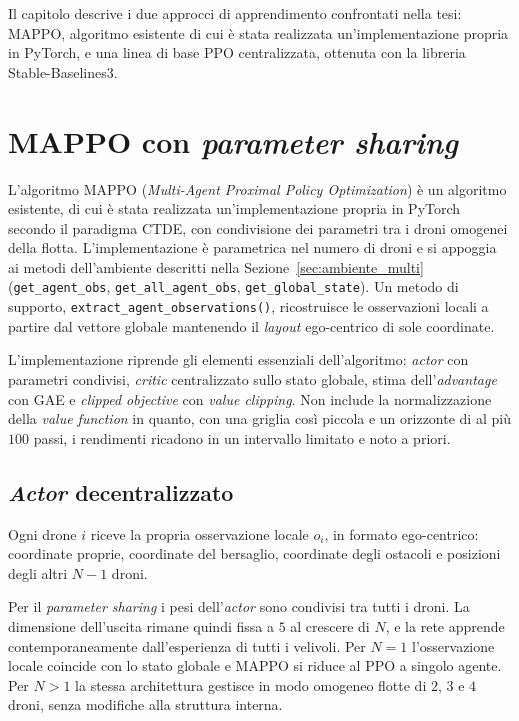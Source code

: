 \documentclass[12pt,a4paper,twoside]{report}
\newcommand{\parencite}[1]{\citep{#1}}
\begin{document}
Il capitolo descrive i due approcci di apprendimento confrontati nella tesi: MAPPO, algoritmo esistente di cui è stata realizzata un'implementazione propria in PyTorch, e una linea di base PPO centralizzata, ottenuta con la libreria Stable-Baselines3.

\section{MAPPO con \emph{parameter sharing}}
\label{sec:mappo}

L'algoritmo MAPPO (\emph{Multi-Agent Proximal Policy Optimization}) \parencite{yu2022} è un algoritmo esistente, di cui è stata realizzata un'implementazione propria in PyTorch secondo il paradigma CTDE, con condivisione dei parametri tra i droni omogenei della flotta. L'implementazione è parametrica nel numero di droni e si appoggia ai metodi dell'ambiente descritti nella Sezione~\ref{sec:ambiente_multi} (\texttt{get\_agent\_obs}, \texttt{get\_all\_agent\_obs}, \texttt{get\_global\_state}). Un metodo di supporto, \texttt{extract\_\allowbreak agent\_\allowbreak observations()}, ricostruisce le osservazioni locali a partire dal vettore globale mantenendo il \emph{layout} ego-centrico di sole coordinate.

L'implementazione riprende gli elementi essenziali dell'algoritmo: \emph{actor} con parametri condivisi, \emph{critic} centralizzato sullo stato globale, stima dell'\emph{advantage} con GAE e \emph{clipped objective} con \emph{value clipping}. Non include la normalizzazione della \emph{value function} in quanto, con una griglia così piccola e un orizzonte di al più $100$ passi, i rendimenti ricadono in un intervallo limitato e noto a priori.

\subsection{\emph{Actor} decentralizzato}
Ogni drone $i$ riceve la propria osservazione locale $o_i$, in formato ego-centrico: coordinate proprie, coordinate del bersaglio, coordinate degli ostacoli e posizioni degli altri $N - 1$ droni.

Per il \emph{parameter sharing} i pesi dell'\emph{actor} sono condivisi tra tutti i droni. La dimensione dell'uscita rimane quindi fissa a $5$ al crescere di $N$, e la rete apprende contemporaneamente dall'esperienza di tutti i velivoli. Per $N = 1$ l'osservazione locale coincide con lo stato globale e MAPPO si riduce al PPO a singolo agente. Per $N > 1$ la stessa architettura gestisce in modo omogeneo flotte di $2$, $3$ e $4$ droni, senza modifiche alla struttura interna.
\end{document}
